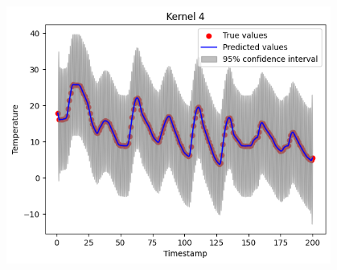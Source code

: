 \documentclass[12pt]{article}
\begin{document}
\begin{center}
    \includegraphics[width=0.8\textwidth]{img/kernel4.png}
\end{center}
\end{document}
